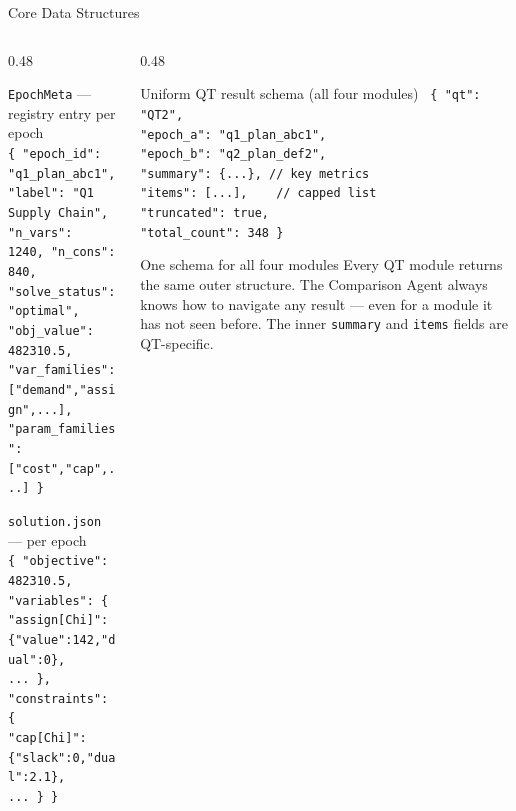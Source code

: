\documentclass[aspectratio=169,10pt]{beamer}
\begin{document}
\begin{frame}[t]{Core Data Structures}
\vspace{2pt}
\begin{columns}[T]
  \begin{column}{0.48\textwidth}
    \begin{block}{\texttt{EpochMeta} — registry entry per epoch}
      \texttt{\scriptsize
        \{\,"epoch\_id": "q1\_plan\_abc1",\\
        \quad "label": "Q1 Supply Chain",\\
        \quad "n\_vars": 1240,\ "n\_cons": 840,\\
        \quad "solve\_status": "optimal",\\
        \quad "obj\_value": 482310.5,\\
        \quad "var\_families": ["demand","assign",...],\\
        \quad "param\_families": ["cost","cap",...]\,\}
      }
    \end{block}
    \vspace{5pt}
    \begin{block}{\texttt{solution.json} — per epoch}
      \texttt{\scriptsize
        \{\,"objective": 482310.5,\\
        \quad "variables":\,\{\\
        \qquad "assign[Chi]":\,\{"value":142,"dual":0\},\\
        \qquad ...\,\},\\
        \quad "constraints":\,\{\\
        \qquad "cap[Chi]":\,\{"slack":0,"dual":2.1\},\\
        \qquad ...\,\}\,\}
      }
    \end{block}
  \end{column}
  \begin{column}{0.48\textwidth}
    \begin{block}{Uniform QT result schema (all four modules)}
      \texttt{\scriptsize
        \{\,"qt": "QT2",\\
        \quad "epoch\_a": "q1\_plan\_abc1",\\
        \quad "epoch\_b": "q2\_plan\_def2",\\
        \quad "summary":\,\{...\},\ \textcolor{mgray}{// key metrics}\\
        \quad "items":\,[...],\ \textcolor{mgray}{\ \ \ // capped list}\\
        \quad "truncated": true,\\
        \quad "total\_count": 348\,\}
      }
    \end{block}
    \vspace{5pt}
    \begin{alertblock}{One schema for all four modules}
      \small Every QT module returns the same outer structure.
      The Comparison Agent always knows how to navigate any
      result — even for a module it has not seen before.
      The inner \texttt{summary} and \texttt{items} fields
      are QT-specific.
    \end{alertblock}
  \end{column}
\end{columns}
\end{frame}
\end{document}
